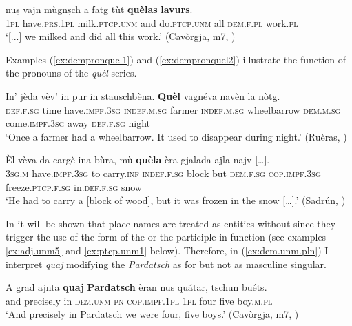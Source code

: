 \ea
\label{ex:dem.anaph2}
\gll [...] nuṣ vajn mùgnṣch a fatg tùt \textbf{quèlas} \textbf{lavurs}.\\
{} \textsc{1pl} have.\textsc{prs.1pl} milk.\textsc{ptcp.unm} and do.\textsc{ptcp.unm} all \textsc{dem.f.pl} work.\textsc{pl}\\
\glt `[...] we milked and did all this work.' (Cavòrgja, m7, )
\z

Examples (\ref{ex:dempronquel1}) and (\ref{ex:dempronquel2}) illustrate the  function of the  pronouns of the \textit{quèl}-series.

\ea
\label{ex:dempronquel1}
\gll    In' jèda vèv’ in pur in stauschbèna. \textbf{Quèl} vagnéva navèn la nòtg.\\
     \textsc{def.f.sg} time have.\textsc{impf.3sg} \textsc{indef.m.sg} farmer \textsc{indef.m.sg} wheelbarrow \textsc{dem.m.sg} come.\textsc{impf.3sg} away \textsc{def.f.sg} night\\
\glt `Once a farmer had a wheelbarrow. It used to disappear during night.' (Ruèras, \citealt[66]{Büchli1966})
\z

\ea\label{ex:dempronquel2}
\gll    Èl vèva da cargè ina bùra, mù \textbf{quèla} èra gjalada ajla najv […].\\
    \textsc{3sg.m} have.\textsc{impf.3sg} to carry.\textsc{inf} \textsc{indef.f.sg} block but \textsc{dem.f.sg} \textsc{cop.impf.3sg} freeze.\textsc{ptcp.f.sg} in.\textsc{def.f.sg} snow\\
\glt `He had to carry a [block of wood], but it was frozen in the snow […].' (Sadrún, \citealt[105]{Büchli1966})
\z

In  it will be shown that place names are treated as entities without  since they trigger the use of the  form of the  or the participle in  function (see examples \ref{ex:adj.unm5} and \ref{ex:ptcp.unm1} below). Therefore, in (\ref{ex:dem.unm.pln}) I interpret \textit{quaj} modifying the  \textit{Pardatsch} as  for  but not as masculine singular.

\ea
\label{ex:dem.unm.pln}
	\gll A grad ajnta \textbf{quaj} \textbf{Pardatsch} èran nus quátar, tschun buéts.   \\
and precisely in \textsc{dem.unm} \textsc{pn} \textsc{cop.impf.1pl} \textsc{1pl} four five boy.\textsc{m.pl}\\
\glt `And precisely in Pardatsch we were four, five boys.' (Cavòrgja, m7, )
\z


